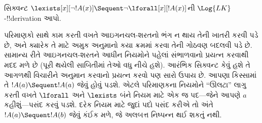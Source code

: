 \documentclass[../../../include/open-logic-section]{subfiles}
\begin{document}


\begin{ex}
સિક્વન્ટ $\lexists[x][\lnot !A(x)] \Sequent
\lnot \lforall[x][!A(x)]$ની $\Log{LK}$-!!{derivation} આપો.

પરિમાણકો સાથે કામ કરતી વખતે આઇગનચલ-શરતનો ભંગ ન થાય તેની ખાતરી કરવી
પડે છે, અને ક્યારેક તે માટે અમુક અનુમાનો કયા ક્રમમાં કરવા તેની ગોઠવણ
બદલવી પડે છે. સામાન્ય રીતે આઇગનચલ-શરતને આધીન નિયમોને પહેલાં સંભાળવાનો
પ્રયત્ન કરવાથી મદદ મળે છે (પૂરી થયેલી સાબિતીમાં તેઓ વધુ નીચે હશે).
આરંભિક સિક્વન્ટ કેવું હશે તે આગળથી વિચારીને અનુમાન કરવાનો પ્રયત્ન કરવો
પણ સારો ઉપાય છે. આપણા કિસ્સામાં તે $!A(a) \Sequent !A(a)$ જેવું હોવું
પડશે. એટલે પરિમાણકના નિયમોને ``ઊલટા'' લાગુ કરતી વખતે $\lforall$ અને
$\lexists$ બંને નિયમ માટે એક જ પદ—જેને આપણે $a$ કહીશું—પસંદ કરવું પડશે.
દરેક નિયમ માટે જુદાં પદો પસંદ કરીએ તો અંતે $!A(a) \Sequent !A(b)$ જેવું
કંઈક મળે, જે અલબત્ત નિષ્પન્ન થઈ શકતું નથી.


\end{ex}
\end{document}
